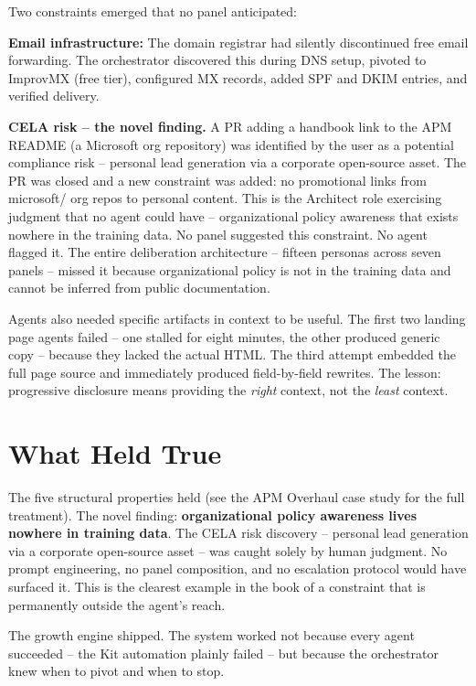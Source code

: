 \documentclass[
  a4paper,
  DIV=11,
  numbers=noendperiod]{scrreprt}
\begin{document}
Two constraints emerged that no panel anticipated:

\textbf{Email infrastructure:} The domain registrar had silently
discontinued free email forwarding. The orchestrator discovered this
during DNS setup, pivoted to ImprovMX (free tier), configured MX
records, added SPF and DKIM entries, and verified delivery.

\textbf{CELA risk -- the novel finding.} A PR adding a handbook link to
the APM README (a Microsoft org repository) was identified by the user
as a potential compliance risk -- personal lead generation via a
corporate open-source asset. The PR was closed and a new constraint was
added: no promotional links from microsoft/ org repos to personal
content. This is the Architect role exercising judgment that no agent
could have -- organizational policy awareness that exists nowhere in the
training data. No panel suggested this constraint. No agent flagged it.
The entire deliberation architecture -- fifteen personas across seven
panels -- missed it because organizational policy is not in the training
data and cannot be inferred from public documentation.

Agents also needed specific artifacts in context to be useful. The first
two landing page agents failed -- one stalled for eight minutes, the
other produced generic copy -- because they lacked the actual HTML. The
third attempt embedded the full page source and immediately produced
field-by-field rewrites. The lesson: progressive disclosure means
providing the \emph{right} context, not the \emph{least} context.

\section{What Held True}\label{what-held-true}

The five structural properties held (see the APM Overhaul case study for
the full treatment). The novel finding: \textbf{organizational policy
awareness lives nowhere in training data}. The CELA risk discovery --
personal lead generation via a corporate open-source asset -- was caught
solely by human judgment. No prompt engineering, no panel composition,
and no escalation protocol would have surfaced it. This is the clearest
example in the book of a constraint that is permanently outside the
agent's reach.

The growth engine shipped. The system worked not because every agent
succeeded -- the Kit automation plainly failed -- but because the
orchestrator knew when to pivot and when to stop.
\end{document}
